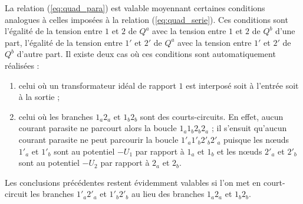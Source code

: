 La relation (\ref{eq:quad_para}) est valable moyennant certaines conditions analogues à celles imposées à la relation (\ref{eq:quad_serie}). Ces conditions sont l'égalité de la tension entre $1$ et $2$ de $Q^a$
avec la tension entre $1$ et $2$ de $Q^b$ d'une part, l'égalité de la tension entre $1'$ et $2'$ de $Q^a$
avec la tension entre $1'$ et $2'$ de $Q^b$ d'autre part.
Il existe deux cas où ces conditions sont automatiquement réalisées :
\begin{enumerate}
\item celui où un transformateur idéal de rapport $1$ est interposé soit à l'entrée soit à la sortie ;
\item celui où les branches $1_a2_a$ et $1_b2_b$ sont des courts-circuits.
En effet, aucun courant parasite ne parcourt alors la boucle $1_a1_b2_b2_a$ ;
il s'ensuit qu'aucun courant parasite ne peut parcourir la boucle $1'_a1'_b2'_b2'_a$  puisque les nœuds $1'_a$ et $1'_b$ sont au potentiel $- U_1$ par rapport à $1_a$ et $1_b$ et les nœuds  $2'_a$ et $2'_b$ sont au potentiel $- U_2$ par rapport à $2_a$ et $2_b$.
\end{enumerate}
Les conclusions précédentes restent évidemment valables si l'on met en court-circuit les branches $1'_a2'_a$ et $1'_b2'_b$ au lieu des branches $1_a2_a$ et $1_b2_b$.






